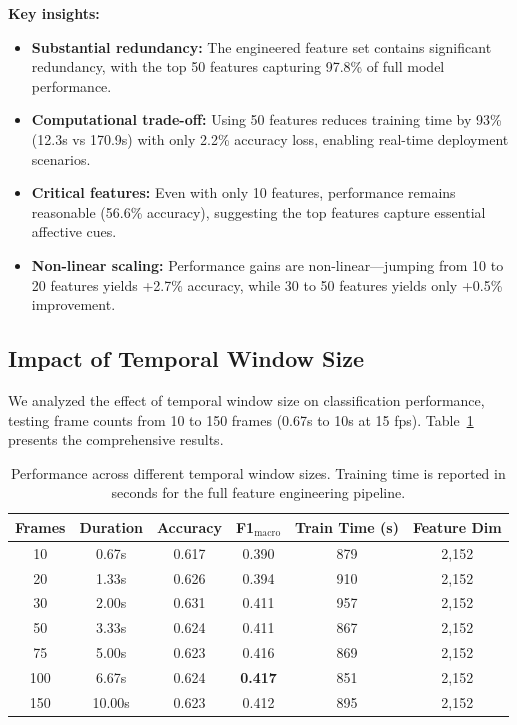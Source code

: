 \textbf{Key insights:}
\begin{itemize}
    \item \textbf{Substantial redundancy:} The engineered feature set contains significant redundancy, with the top 50 features capturing 97.8\% of full model performance.

    \item \textbf{Computational trade-off:} Using 50 features reduces training time by 93\% (12.3s vs 170.9s) with only 2.2\% accuracy loss, enabling real-time deployment scenarios.

    \item \textbf{Critical features:} Even with only 10 features, performance remains reasonable (56.6\% accuracy), suggesting the top features capture essential affective cues.

    \item \textbf{Non-linear scaling:} Performance gains are non-linear---jumping from 10 to 20 features yields +2.7\% accuracy, while 30 to 50 features yields only +0.5\% improvement.
\end{itemize}

\subsection{Impact of Temporal Window Size}
\label{sec:temporal-window}

We analyzed the effect of temporal window size on classification performance, testing frame counts from 10 to 150 frames (0.67s to 10s at 15 fps). Table~\ref{tab:frame-count-results} presents the comprehensive results.

\begin{table}[t]
\centering
\caption{Performance across different temporal window sizes. Training time is reported in seconds for the full feature engineering pipeline.}
\label{tab:frame-count-results}
\begin{tabular}{cccccc}
\toprule
\textbf{Frames} & \textbf{Duration} & \textbf{Accuracy} & \textbf{F1$_{\text{macro}}$} & \textbf{Train Time (s)} & \textbf{Feature Dim} \\
\midrule
10 & 0.67s & 0.617 & 0.390 & 879 & 2,152 \\
20 & 1.33s & 0.626 & 0.394 & 910 & 2,152 \\
30 & 2.00s & 0.631 & 0.411 & 957 & 2,152 \\
50 & 3.33s & 0.624 & 0.411 & 867 & 2,152 \\
75 & 5.00s & 0.623 & 0.416 & 869 & 2,152 \\
100 & 6.67s & 0.624 & \textbf{0.417} & 851 & 2,152 \\
150 & 10.00s & 0.623 & 0.412 & 895 & 2,152 \\
\bottomrule
\end{tabular}
\end{table}

